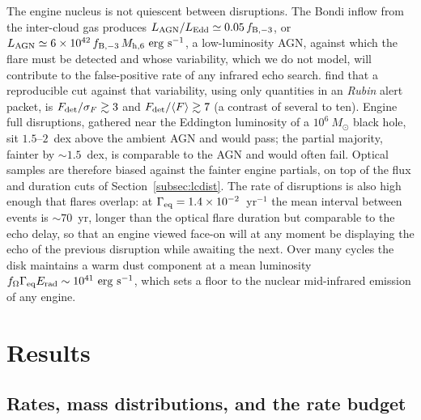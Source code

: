 \documentclass[twocolumn,pdftex]{aastex701}
\newcommand{\msun}{M_{\odot}\xspace}
\newcommand{\mhsix}{M_{\rm h,6}\xspace}
\newcommand{\gameq}{\Gamma_{\rm eq}\xspace}
\newcommand{\fom}{f_{\Omega}\xspace}
\newcommand{\lsst}{{\it Rubin}\xspace}
\begin{document}
The engine nucleus is not quiescent between disruptions. The Bondi inflow from the inter-cloud gas produces $L_{\rm AGN}/L_{\rm Edd} \simeq 0.05\, f_{\rm B,-3}$, or $L_{\rm AGN} \simeq 6 \times 10^{42}\, f_{\rm B,-3}\, \mhsix~{\rm erg~s^{-1}}$, a low-luminosity AGN, against which the flare must be detected and whose variability, which we do not model, will contribute to the false-positive rate of any infrared echo search. \citet{Magill:2026b} find that a reproducible cut against that variability, using only quantities in an \lsst alert packet, is $F_{\rm det}/\sigma_{F} \gtrsim 3$ and $F_{\rm det}/\langle F\rangle \gtrsim 7$ (a contrast of several to ten). Engine full disruptions, gathered near the Eddington luminosity of a $10^{6}~\msun$ black hole, sit $1.5$--$2$~dex above the ambient AGN and would pass; the partial majority, fainter by $\sim 1.5$~dex, is comparable to the AGN and would often fail. Optical samples are therefore biased against the fainter engine partials, on top of the flux and duration cuts of Section~\ref{subsec:lcdist}. The rate of disruptions is also high enough that flares overlap: at $\gameq = 1.4 \times 10^{-2}$~yr$^{-1}$ the mean interval between events is $\sim 70$~yr, longer than the optical flare duration but comparable to the echo delay, so that an engine viewed face-on will at any moment be displaying the echo of the previous disruption while awaiting the next. Over many cycles the disk maintains a warm dust component at a mean luminosity $\fom \gameq E_{\rm rad} \sim 10^{41}~{\rm erg~s^{-1}}$, which sets a floor to the nuclear mid-infrared emission of any engine.

\section{Results}\label{sec:results}

\subsection{Rates, mass distributions, and the rate budget}\label{subsec:rates_result}
\end{document}
